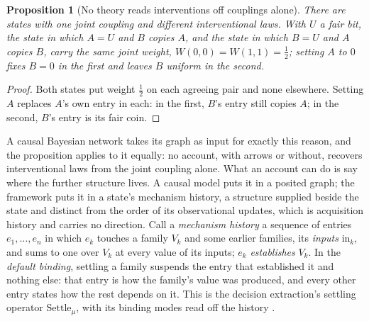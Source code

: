 \documentclass[11pt]{article}
\newtheorem{proposition}{Proposition}
\begin{document}
\begin{proposition}[No theory reads interventions off couplings alone]
\label{prop:parity}
There are states with one joint coupling and different interventional laws. With $U$ a fair bit, the state in which $A = U$ and $B$ copies $A$, and the state in which $B = U$ and $A$ copies $B$, carry the same joint weight, $W(0,0) = W(1,1) = \tfrac12$; setting $A$ to $0$ fixes $B = 0$ in the first and leaves $B$ uniform in the second.
\end{proposition}
\begin{proof}
Both states put weight $\tfrac12$ on each agreeing pair and none elsewhere. Setting $A$ replaces $A$'s own entry in each: in the first, $B$'s entry still copies $A$; in the second, $B$'s entry is its fair coin.
\end{proof}

\noindent A causal Bayesian network takes its graph as input for exactly this reason, and the proposition applies to it equally: no account, with arrows or without, recovers interventional laws from the joint coupling alone. What an account can do is say where the further structure lives. A causal model puts it in a posited graph; the framework puts it in a state's mechanism history, a structure supplied beside the state and distinct from the order of its observational updates, which is acquisition history and carries no direction. Call a \emph{mechanism history} a sequence of entries $e_1, \ldots, e_n$ in which $e_k$ touches a family $V_k$ and some earlier families, its \emph{inputs} $\mathrm{in}_k$, and sums to one over $V_k$ at every value of its inputs; $e_k$ \emph{establishes} $V_k$. In the \emph{default binding}, settling a family suspends the entry that established it and nothing else: that entry is how the family's value was produced, and every other entry states how the rest depends on it. This is the decision extraction's settling operator $\mathrm{Settle}_\mu$, with its binding modes read off the history \cite{AethusDecision}.
\end{document}
